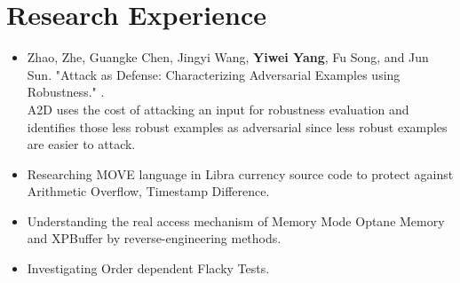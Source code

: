 \documentclass{resume}
\newcommand{\en}[1]{#1}
\newcommand{\zh}[1]{}
\begin{document}
\section{\en{Research Experience}\zh{研究经历}}
\en{}
\zh{\datedsubsection{\textbf{\href{http://s3l.shanghaitech.edu.cn/}{上海科技大学系统}\href{https://toast-lab.gitee.io/}{实验室}}}{2019/07 -- 2021/06}}
\en{}
\zh{\role{本科生科研}{实习}}
\begin{itemize}
      \item Zhao, Zhe, Guangke Chen, Jingyi Wang, \textbf{Yiwei Yang}, Fu Song, and Jun Sun. "Attack as Defense: Characterizing Adversarial Examples using Robustness."  .\\
            \small{ \en{A2D uses the cost of attacking an input for robustness evaluation and identifies those less robust examples as adversarial since less robust examples are easier to attack.}
            \zh{A2D使用攻击输入的成本来进行鲁棒性评估，并将那些鲁棒性较差的例子确定为对抗性，因为鲁棒性较差的例子更容易被攻击。}}
      \item \en{Researching MOVE language in Libra currency source code to protect against Arithmetic Overflow, Timestamp Difference.}
            \zh{研究libra源码中的MOVE prover，提高抵御时间戳攻击、整数溢出等的安全性。}
      \item \en{Understanding the real access mechanism of Memory Mode Optane Memory and XPBuffer by reverse-engineering methods.}
            \zh{通过逆向工程的相关手段去理解在memory mode 下傲腾内存以及XPBuffer的访存逻辑。}
\end{itemize}

\en{}
\zh{\datedsubsection{\textbf{\href{https://illinois.edu}{伊利诺伊大学厄巴纳-香槟分校}\href{http://mir.cs.illinois.edu/marinov/}{Darko Marinov组}}}{2021/07 -- 2021/10}}
\en{}
\zh{\role{本科生科研}{暑研项目}}
\begin{itemize}
      \item \en{Investigating Order dependent Flacky Tests.}
            \zh{使用Flacky Test进行数据竞争检查。}
\end{itemize}
\end{document}
